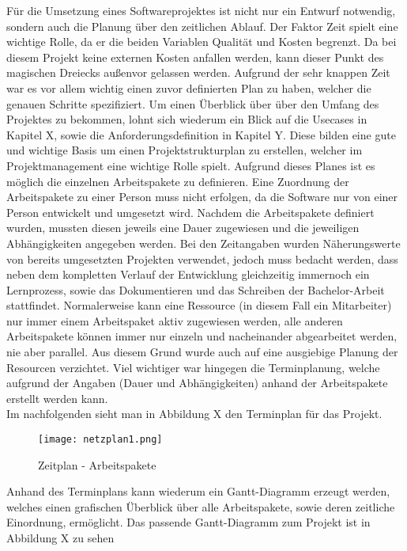 Für die Umsetzung eines Softwareprojektes ist nicht nur ein Entwurf notwendig, sondern auch die Planung über den zeitlichen Ablauf. Der Faktor Zeit spielt eine wichtige Rolle, da er die beiden Variablen Qualität und Kosten begrenzt. Da bei diesem Projekt keine externen Kosten anfallen werden, kann dieser Punkt des magischen Dreiecks außenvor gelassen werden.
Aufgrund der sehr knappen Zeit war es vor allem wichtig einen zuvor definierten Plan zu haben, welcher die genauen Schritte spezifiziert. Um einen Überblick über über den Umfang des Projektes zu bekommen, lohnt sich wiederum ein Blick auf die Usecases in Kapitel X, sowie die Anforderungsdefinition in Kapitel Y. Diese bilden eine gute und wichtige Basis um einen Projektstrukturplan zu erstellen, welcher im Projektmanagement eine wichtige Rolle spielt. Aufgrund dieses Planes ist es möglich die einzelnen Arbeitspakete zu definieren. Eine Zuordnung der Arbeitspakete zu einer Person muss nicht erfolgen, da die Software nur von einer Person entwickelt und umgesetzt wird. Nachdem die Arbeitspakete definiert wurden, mussten diesen jeweils eine Dauer zugewiesen und die jeweiligen Abhängigkeiten angegeben werden.
Bei den Zeitangaben wurden Näherungswerte von bereits umgesetzten Projekten verwendet, jedoch muss bedacht werden, dass neben dem kompletten Verlauf der Entwicklung gleichzeitig immernoch ein Lernprozess, sowie das Dokumentieren und das Schreiben der Bachelor-Arbeit stattfindet.  Normalerweise kann eine Ressource (in diesem Fall ein Mitarbeiter) nur immer einem Arbeitspaket aktiv zugewiesen werden, alle anderen Arbeitspakete können immer nur einzeln und nacheinander abgearbeitet werden, nie aber parallel. Aus diesem Grund wurde auch auf eine ausgiebige Planung der Resourcen verzichtet. Viel wichtiger war hingegen die Terminplanung, welche aufgrund der Angaben (Dauer und Abhängigkeiten) anhand der Arbeitspakete erstellt werden kann.\\
Im nachfolgenden sieht man in Abbildung X den Terminplan für das Projekt.\\

\begin{figure}[H]
\centering
\texttt{[image: netzplan1.png]}
\caption{Zeitplan - Arbeitspakete}
\label{fig:benchsnmpbulk}
\end{figure}

Anhand des Terminplans kann wiederum ein Gantt-Diagramm erzeugt werden, welches einen grafischen Überblick über alle Arbeitspakete, sowie deren zeitliche Einordnung, ermöglicht. Das passende Gantt-Diagramm zum Projekt ist in Abbildung X zu sehen

